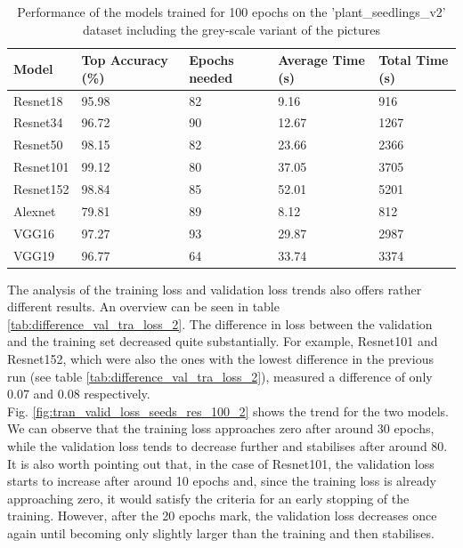 \begin{table}[htbp]
\centering
\begin{tabular}{ p{2cm} p{4cm} p{3cm} p{3cm} p{2cm}  }
 Model& Top Accuracy (\%) & Epochs needed &Average Time (s)&Total Time (s)\\
 \hline
Resnet18&95.98&82&9.16&916\\
Resnet34&96.72&90&12.67&1267\\
Resnet50&98.15&82&23.66&2366\\
Resnet101&99.12&80&37.05&3705\\
Resnet152&98.84&85&52.01&5201\\
Alexnet&79.81&89&8.12&812\\
VGG16&97.27&93&29.87&2987\\
VGG19&96.77&64&33.74&3374\\
 \hline
\end{tabular}
\caption{Performance of the models trained for 100 epochs on the 'plant\_seedlings\_v2' dataset including the grey-scale variant of the pictures}
\label{tab:performances_seeds_gray}
\end{table}

The analysis of the training loss and validation loss trends also offers rather different results. An overview can be seen in table \ref{tab:difference_val_tra_loss_2}. The difference in loss between the validation and the training set decreased quite substantially. For example, Resnet101 and Resnet152, which were also the ones with the lowest difference in the previous run (see table \ref{tab:difference_val_tra_loss_2}), measured a difference of only 0.07 and 0.08 respectively. \\
Fig. \ref{fig:tran_valid_loss_seeds_res_100_2} shows the trend for the two models. We can observe that the training loss approaches zero after around 30 epochs, while the validation loss tends to decrease further and stabilises after around 80. It is also worth pointing out that, in the case of Resnet101, the validation loss starts to increase after around 10 epochs and, since the training loss is already approaching zero, it would satisfy the criteria for an early stopping of the training. However, after the 20 epochs mark, the validation loss decreases once again until becoming only slightly larger than the training and then stabilises. 

